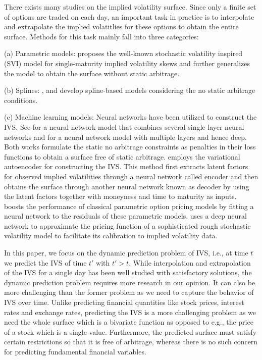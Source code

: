 \documentclass[11pt,a4paper]{article}
\theoremstyle{remark}
\begin{document}
There exists many studies on the implied volatility surface. Since only a finite set of options are traded on each day, an important task in practice is to interpolate and extrapolate the implied volatitlies for these options to obtain the entire surface. Methods for this task mainly fall into three categories: 

(a) Parametric models: \cite{gatheral2004parsimonious} proposes the well-known stochastic volatility inspired (SVI) model for single-maturity implied volatility skews and \cite{gatheral2014arbitrage} further generalizes the model to obtain the surface without static arbitrage. 

(b) Splines: \cite{fengler2009arbitrage}, \cite{orosi2015arbitrage} and \cite{fengler2015semi} develop spline-based models considering the no static arbitrage conditions. 

(c) Machine learning models: Neural networks have been utilized to construct the IVS. See \cite{zheng2019gated} for a neural network model that combines several single layer neural networks and \cite{deep_IVS} for a neural network model with multiple layers and hence deep. Both works formulate the static no arbitrage constraints as penalties in their loss functions to obtain a surface free of static arbitrage. \cite{bergeron2021variational} employs the variational autoencoder for constructing the IVS. This method first extracts latent factors for observed implied volatilities through a neural network called encoder and then obtains the surface through another neural network known as decoder by using the latent factors together with moneyness and time to maturity as inputs. \cite{almeida2021can} boosts the performance of classical parametric option pricing models by fitting a neural network to the residuals of these parametric models. \cite{horvath2021deep} uses a deep neural network to approximate the pricing function of a sophisticated rough stochastic volatility model to facilitate its calibration to implied volatility data.

In this paper, we focus on the dynamic prediction problem of IVS, i.e., at time $t$ we predict the IVS of time $t'$ with $t'>t$. While interpolation and extrapolation of the IVS for a single day has been well studied with satisfactory solutions, the dynamic prediction problem requires more research in our opinion. It can also be more challenging than the former problem as we need to capture the behavior of IVS over time. Unlike predicting financial quantities like stock prices, interest rates and exchange rates, predicting the IVS is a more challenging problem as we need the whole surface which is a bivariate function as opposed to e.g., the price of a stock which is a single value. Furthermore, the predicted surface must satisfy certain restrictions so that it is free of arbitrage, whereas there is no such concern for predicting fundamental financial variables.   
\end{document}
